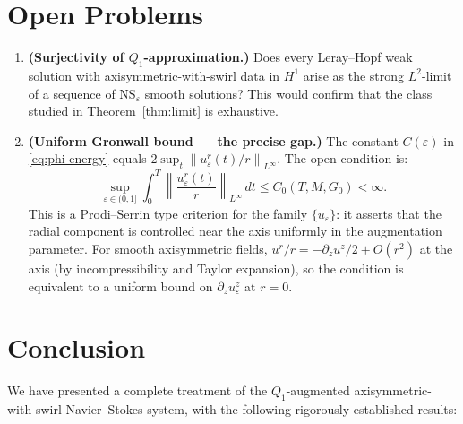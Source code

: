\documentclass{article}
\theoremstyle{definition}
\theoremstyle{remark}
\newcommand{\e}{\varepsilon}
\newcommand{\norm}[1]{\left\|#1\right\|}
\begin{document}
\section{Open Problems}\label{sec:open}

\begin{enumerate}

\item[\textbf{OP1.}]\label{op:limits}
  \textbf{(Surjectivity of $Q_1$-approximation.)}
  Does every Leray--Hopf weak solution with axisymmetric-with-swirl data
  in $H^1$ arise as the strong $L^2$-limit of a sequence of
  $\mathrm{NS}_\e$ smooth solutions?  This would confirm that the class
  studied in Theorem~\ref{thm:limit} is exhaustive.

\item[\textbf{OP2.}]\label{op:gronwall}
  \textbf{(Uniform Gronwall bound --- the precise gap.)}
  The constant $C(\e)$ in \eqref{eq:phi-energy} equals
  $2\sup_t\norm{u_\e^r(t)/r}_{L^\infty}$.  The open condition is:
  \[
    \sup_{\e\in(0,1]}\int_0^T\norm{\frac{u_\e^r(t)}{r}}_{L^\infty}\,dt
    \le C_0(T, M, G_0) < \infty.
  \]
  This is a Prodi--Serrin type criterion \cite{Serrin1962} for the family
  $\{u_\e\}$: it asserts that the radial component is controlled near
  the axis uniformly in the augmentation parameter.  For smooth axisymmetric
  fields, $u^r/r = -\partial_z u^z/2 + O(r^2)$ at the axis (by
  incompressibility and Taylor expansion), so the condition is equivalent
  to a uniform bound on $\partial_z u^z_\e$ at $r=0$.

\end{enumerate}

\section{Conclusion}\label{sec:conclusion}

We have presented a complete treatment of the $Q_1$-augmented
axisymmetric-with-swirl Navier--Stokes system, with the following
rigorously established results:
\end{document}
